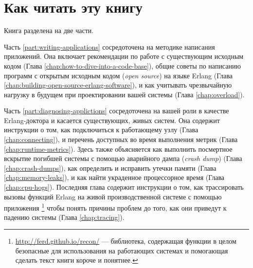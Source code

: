 \documentclass[11pt, oneside]{book}   	%
\begin{document}
\section*{Как читать эту книгу}
\label{sec:how-to-read-this-book}

Книга разделена на две части.

Часть \ref{part:writing-applications} сосредоточена на методике написания приложений. Она включает рекомендации по работе с существующим исходным кодом (Глава \ref{chap:how-to-dive-into-a-code-base}), общие советы по написанию программ с открытым исходным кодом (\emph{open source}) на языке Erlang (Глава \ref{chap:building-open-source-erlang-software}), и как учитывать чрезвычайную нагрузку в будущем при проектировании вашей системы (Глава \ref{chap:overload}).


Часть \ref{part:diagnosing-applictions} сосредоточена на вашей роли в качестве Erlang-доктора и касается существующих, живых систем. Она содержит инструкции о том, как подключиться к работающему узлу (Глава \ref{chap:connecting}), и перечень доступных во время выполнения метрик (Глава \ref{chap:runtime-metrics}). Здесь также объясняется как выполнить посмертное вскрытие погибшей системы с помощью аварийного дампа (\emph{crash dump}) (Глава \ref{chap:crash-dumps}), как определить и исправить утечки памяти (Глава \ref{chap:memory-leaks}), и как найти украденное процессорное время (Глава \ref{chap:cpu-hogs}). Последняя глава содержит инструкции о том, как трассировать вызовы функций Erlang на живой производственной системе с помощью приложения \footnote{\href{http://ferd.github.io/recon/}{http://ferd.github.io/recon/} — библиотека, содержащая функции в целом безопасные для использования на работающих системах и помогающая сделать текст книги короче и понятнее.} чтобы понять причины проблем до того, как они приведут к падению системы (Глава \ref{chap:tracing}).
\end{document}
